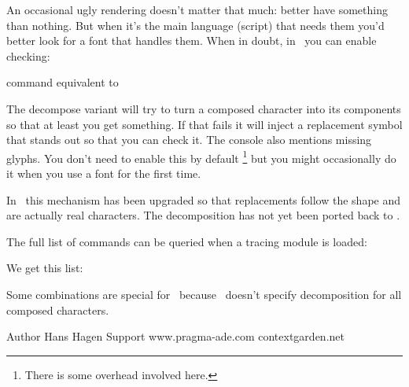 An occasional ugly rendering doesn't matter that much: better have something than
nothing. But when it's the main language (script) that needs them you'd better
look for a font that handles them. When in doubt, in \CONTEXT\ you can enable
checking:

\starttabulate[|l|l|]
    \BC command                           \BC equivalent to \NC \NR
    \NC \type {\checkmissingcharacters}   \NC {} \NC \NR
    \NC \type {\removemissingcharacters}  \NC \type{\enabletrackers[fonts.missing=remove]} \NC \NR
    \NC \type {\replacemissingcharacters} \NC \type{\enabletrackers[fonts.missing=replace]} \NC \NR
    \NC \type {\handlemissingcharacters}  \NC \type{\enabletrackers[fonts.missing={decompose,replace}]} \NC \NR
\stoptabulate

The decompose variant will try to turn a composed character into its components
so that at least you get something. If that fails it will inject a replacement
symbol that stands out so that you can check it. The console also mentions
missing glyphs. You don't need to enable this by default \footnote {There is some
overhead involved here.} but you might occasionally do it when you use a font for
the first time.

In \LMTX\ this mechanism has been upgraded so that replacements follow the shape
and are actually real characters. The decomposition has not yet been ported back
to \MKIV.

The full list of commands can be queried when a tracing module is loaded:

\startbuffer
{}

\showcharactercombinations
\stopbuffer

\typebuffer

We get this list:

\getbuffer

Some combinations are special for \CONTEXT\ because \UNICODE\ doesn't specify
decomposition for all composed characters.

\stopsection

\startsubject[title=Colofon]

\starttabulate
\NC Author      \NC Hans Hagen         \NC \NR
\NC \CONTEXT    \NC \contextversion    \NC \NR
\NC \LUAMETATEX \NC \texengineversion  \NC \NR
\NC Support     \NC www.pragma-ade.com \NC \NR
\NC             \NC contextgarden.net  \NC \NR
\stoptabulate

\stopsubject

